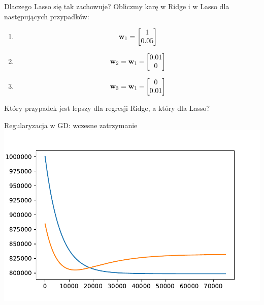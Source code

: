 \documentclass{sa}
\renewcommand{\vec}[1]{\ensuremath\mathbf{#1}}
\begin{document}
\begin{frame}{Dlaczego Lasso się tak zachowuje?}
Obliczmy karę w Ridge i w Lasso dla następujących przypadków:
\begin{enumerate}
\item \[ \vec{w}_1=\begin{bmatrix} 1 \\ 0.05 \end{bmatrix} \]
\pause
\item \[ \vec{w}_2=\vec{w}_1-\begin{bmatrix} 0.01 \\ 0 \end{bmatrix} \]
\pause
\item \[ \vec{w}_3=\vec{w}_1-\begin{bmatrix} 0 \\ 0.01 \end{bmatrix} \]
\end{enumerate}
\pause
\alert{Który przypadek jest lepszy dla regresji Ridge, a który dla Lasso?}
\end{frame}

\begin{frame}{Regularyzacja w GD: wczesne zatrzymanie}
\includegraphics[width=\textwidth]{earlystopping.pdf}
\end{frame}
\end{document}
